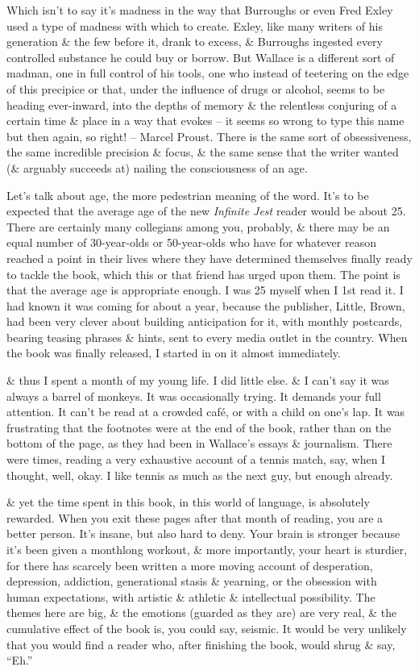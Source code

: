 \documentclass{article}
\numberwithin{equation}{section}
\begin{document}
Which isn't to say it's madness in the way that Burroughs or even Fred Exley used a type of madness with which to create. Exley, like many writers of his generation \& the few before it, drank to excess, \& Burroughs ingested every controlled substance he could buy or borrow. But Wallace is a different sort of madman, one in full control of his tools, one who instead of teetering on the edge of this precipice or that, under the influence of drugs or alcohol, seems to be heading ever-inward, into the depths of memory \& the relentless conjuring of a certain time \& place in a way that evokes -- it seems so wrong to type this name but then again, so right! -- Marcel Proust. There is the same sort of obsessiveness, the same incredible precision \& focus, \& the same sense that the writer wanted (\& arguably succeeds at) nailing the consciousness of an age.

Let's talk about age, the more pedestrian meaning of the word. It's to be expected that the average age of the new \textit{Infinite Jest} reader would be about 25. There are certainly many collegians among you, probably, \& there may be an equal number of 30-year-olds or 50-year-olds who have for whatever reason reached a point in their lives where they have determined themselves finally ready to tackle the book, which this or that friend has urged upon them. The point is that the average age is appropriate enough. I was 25 myself when I 1st read it. I had known it was coming for about a year, because the publisher, Little, Brown, had been very clever about building anticipation for it, with monthly postcards, bearing teasing phrases \& hints, sent to every media outlet in the country. When the book was finally released, I started in on it almost immediately.

\& thus I spent a month of my young life. I did little else. \& I can't say it was always a barrel of monkeys. It was occasionally trying. It demands your full attention. It can't be read at a crowded caf\'e, or with a child on one's lap. It was frustrating that the footnotes were at the end of the book, rather than on the bottom of the page, as they had been in Wallace's essays \& journalism. There were times, reading a very exhaustive account of a tennis match, say, when I thought, well, okay. I like tennis as much as the next guy, but enough already.

\& yet the time spent in this book, in this world of language, is absolutely rewarded. When you exit these pages after that month of reading, you are a better person. It's insane, but also hard to deny. Your brain is stronger because it's been given a monthlong workout, \& more importantly, your heart is sturdier, for there has scarcely been written a more moving account of desperation, depression, addiction, generational stasis \& yearning, or the obsession with human expectations, with artistic \& athletic \& intellectual possibility. The themes here are big, \& the emotions (guarded as they are) are very real, \& the cumulative effect of the book is, you could say, seismic. It would be very unlikely that you would find a reader who, after finishing the book, would shrug \& say, ``Eh.''
\end{document}
